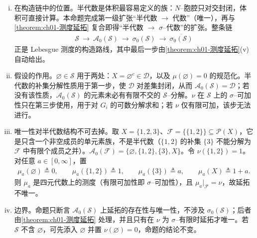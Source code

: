 \documentclass[../../main.tex]{subfiles}%
\begin{document}
\begin{remark}\label{remark:ch01-半代数延拓}
\begin{enumerate}[(i)]
\item 在构造链中的位置。半代数是体积最容易定义的族：$N$--胞腔只对交封闭，体积可直接计算。本命题完成第一级扩张“半代数 $\to$ 代数”（唯一），再与\cref{theorem:ch01-测度延拓} 复合即得“半代数 $\to$ $\sigma$--代数”的扩张。整条链
\begin{align*}
\mathcal{S}\ \longrightarrow\ \mathcal{A}_0(\mathcal{S})\ \longrightarrow\ \sigma_0(\mathcal{S})\ \longrightarrow\ \overline{\sigma_0(\mathcal{S})}
\end{align*}
正是 Lebesgue 测度的构造路线，其中最后一步由\cref{theorem:ch01-测度延拓}(v) 自动给出。
\item 假设的作用。$\varnothing\in\mathcal{S}$ 用于两处：$X=\varnothing^c\in\mathcal{D}$，以及 $\mu(\varnothing )=0$ 的规范化。半代数的补集分解性质用于第一步，使 $\mathcal{D}$ 对差集封闭，从而 $\mathcal{A}_0(\mathcal{S})=\mathcal{D}$；若没有该性质，$\mathcal{A}_0(\mathcal{S})$ 的元素未必有有限不交的 $\mathcal{S}$--分解。$\nu$ 在 $\mathcal{S}$ 上的 $\sigma$--可加性只在第三步使用，用于对 $G_i$ 的可数分解求和；若 $\nu$ 仅有限可加，该步无法进行。
\item 唯一性对半代数结构不可去掉。取 $X=\{1,2,3\}$、$\mathcal{F}=\{\{1,2\}\}\subseteq\mathcal{P}(X)$，它是只含一个非空成员的单元素族，不是半代数（$\{1,2\}$ 的补集 $\{3\}$ 不能分解为 $\mathcal{F}$ 中有限个成员之并）。$\mathcal{A}_0(\mathcal{F})=\{\varnothing ,\{1,2\},\{3\},X\}$。令 $\nu(\{1,2\})=1$。对任意 $a\in[0,\infty]$，置
\begin{align*}
\mu_a(\varnothing )\triangleq 0,\qquad \mu_a(\{1,2\})\triangleq 1,\qquad \mu_a(\{3\})\triangleq a,\qquad \mu_a(X)\triangleq 1+a.
\end{align*}
则 $\mu_a$ 是四元代数上的测度（有限可加性即 $\sigma$--可加性），且 $\mu_a|_{\mathcal{F}}=\nu$，故延拓不唯一。
\item 边界。命题只断言 $\mathcal{A}_0(\mathcal{S})$ 上延拓的存在性与唯一性，不涉及 $\sigma_0(\mathcal{S})$；后者由\cref{theorem:ch01-测度延拓} 处理，并且只有在 $\nu$ 为 $\sigma$--有限时延拓才唯一。若 $\mathcal{S}$ 不含 $\varnothing$，可先添入 $\varnothing$ 并置 $\nu(\varnothing )=0$，命题的结论不变。
\end{enumerate}
\end{remark}
\end{document}
